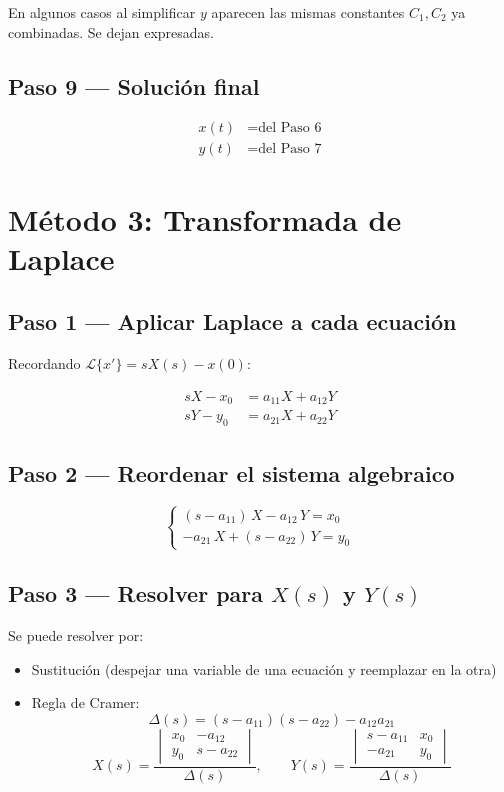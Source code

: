 \documentclass[9pt,a4paper]{article}
\begin{document}
En algunos casos al simplificar \(y\) aparecen las mismas constantes \(C_1, C_2\) ya combinadas. Se dejan expresadas.

\subsection{Paso 9 --- Solución final}

\[
\boxed{
\begin{aligned}
x(t) &= \text{del Paso 6} \\
y(t) &= \text{del Paso 7}
\end{aligned}
}
\]

\section{Método 3: Transformada de Laplace}

\subsection{Paso 1 --- Aplicar Laplace a cada ecuación}

Recordando \(\mathcal{L}\{x'\} = sX(s) - x(0)\):

\[
\begin{aligned}
sX - x_0 &= a_{11}X + a_{12}Y \\
sY - y_0 &= a_{21}X + a_{22}Y
\end{aligned}
\]

\subsection{Paso 2 --- Reordenar el sistema algebraico}

\[
\begin{cases}
(s - a_{11})\,X - a_{12}\,Y = x_0 \\[2pt]
-a_{21}\,X + (s - a_{22})\,Y = y_0
\end{cases}
\]

\subsection{Paso 3 --- Resolver para \(X(s)\) y \(Y(s)\)}

Se puede resolver por:
\begin{itemize}
  \item Sustitución (despejar una variable de una ecuación y reemplazar en la otra)
  \item Regla de Cramer:
  \[
  \Delta(s) = (s - a_{11})(s - a_{22}) - a_{12}a_{21}
  \]
  \[
  X(s) = \frac{
    \begin{vmatrix}
    x_0 & -a_{12} \\
    y_0 & s - a_{22}
    \end{vmatrix}
  }{\Delta(s)},
  \qquad
  Y(s) = \frac{
    \begin{vmatrix}
    s - a_{11} & x_0 \\
    -a_{21}    & y_0
    \end{vmatrix}
  }{\Delta(s)}
  \]
\end{itemize}
\end{document}
